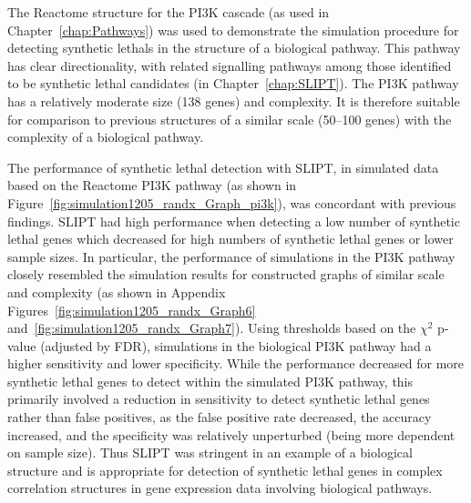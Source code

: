 The Reactome  structure for the \gls{PI3K} cascade (as used in Chapter~\ref{chap:Pathways}) was used to demonstrate the simulation procedure for detecting \glspl{synthetic lethal} in the  structure of a biological pathway. This pathway has clear directionality, with related signalling pathways among those identified to be \gls{synthetic lethal} candidates (in Chapter~\ref{chap:SLIPT}). The \gls{PI3K} pathway has a relatively moderate size (138 genes) and complexity. It is therefore suitable for comparison to previous  structures of a similar scale (50--100 genes) with the complexity of a biological pathway.

The performance of \gls{synthetic lethal} detection with \gls{SLIPT}, in simulated  data based on the Reactome \gls{PI3K} pathway (as shown in Figure~\ref{fig:simulation1205_randx_Graph_pi3k}), was concordant with previous findings. \gls{SLIPT} had high performance when detecting a low number of \gls{synthetic lethal} genes which decreased for high numbers of \gls{synthetic lethal} genes or lower sample sizes. In particular, the performance of simulations in the \gls{PI3K} pathway closely resembled the simulation results for constructed \glspl{graph} of similar scale and complexity (as shown in Appendix Figures~\ref{fig:simulation1205_randx_Graph6} and~\ref{fig:simulation1205_randx_Graph7}). Using thresholds based on the $\chi^2$ p-value (adjusted by \gls{FDR}), simulations in the biological \gls{PI3K} pathway had a higher sensitivity and lower specificity. While the performance decreased for more \gls{synthetic lethal} genes to detect within the simulated \gls{PI3K} pathway, this primarily involved a reduction in sensitivity to detect \gls{synthetic lethal} genes rather than false positives, as the false positive rate decreased, the accuracy increased, and the specificity was relatively unperturbed (being more dependent on sample size). Thus \gls{SLIPT} was stringent in an example of a biological  structure and is appropriate for detection of \gls{synthetic lethal} genes in complex correlation structures in \gls{gene expression} data involving biological pathways. 


